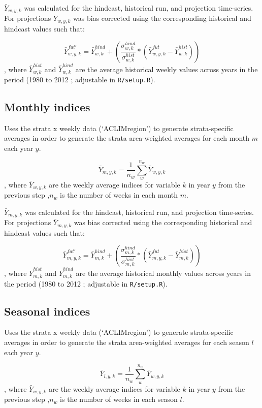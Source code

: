 \documentclass[
]{article}
\begin{document}
\(\bar{Y}_{w,y,k}\) was calculated for the hindcast, historical run, and
projection time-series. For projections \(\bar{Y}_{w,y,k}\) was bias
corrected using the corresponding historical and hindcast values such
that:

\[\bar{Y}^{fut'}_{w,y,k} =\bar{Y}^{hind}_{w,k} +\left( \frac{\sigma^{hind}_{w,k}}{\sigma^{hist}_{w,k}}*(\bar{Y}^{fut}_{w,y,k}-\bar{Y}^{hist}_{w,k})  \right )\],
where \(\bar{Y}^{hist}_{w,k}\) and \(\bar{Y}^{hind}_{w,k}\) are the
average historical weekly values across years in the period (1980 to
2012 ; adjustable in \texttt{R/setup.R}).

\hypertarget{monthly-indices}{%
\subsection{Monthly indices}\label{monthly-indices}}

Uses the strata x weekly data (`ACLIMregion') to generate
strata-specific averages in order to generate the strata area-weighted
averages for each month \(m\) each year \(y\).

\[\bar{Y}_{m,y,k}= \frac{1}{n_w}\sum^{n_w}_{w}\bar{Y}_{w,y,k}\], where
\(\bar{Y}_{w,y,k}\) are the weekly average indices for variable \(k\) in
year \(y\) from the previous step ,\(n_w\) is the number of weeks in
each month \(m\).

\(\bar{Y}_{m,y,k}\) was calculated for the hindcast, historical run, and
projection time-series. For projections \(\bar{Y}_{m,y,k}\) was bias
corrected using the corresponding historical and hindcast values such
that:

\[\bar{Y}^{fut'}_{m,y,k} =\bar{Y}^{hind}_{m,k} +\left( \frac{\sigma^{hind}_{m,k}}{\sigma^{hist}_{m,k}}*(\bar{Y}^{fut}_{m,y,k}-\bar{Y}^{hist}_{m,k})  \right )\],
where \(\bar{Y}^{hist}_{m,k}\) and \(\bar{Y}^{hind}_{m,k}\) are the
average historical monthly values across years in the period (1980 to
2012 ; adjustable in \texttt{R/setup.R}).

\hypertarget{seasonal-indices}{%
\subsection{Seasonal indices}\label{seasonal-indices}}

Uses the strata x weekly data (`ACLIMregion') to generate
strata-specific averages in order to generate the strata area-weighted
averages for each season \(l\) each year \(y\).

\[\bar{Y}_{l,y,k}= \frac{1}{n_w}\sum^{n_w}_{w}\bar{Y}_{w,y,k}\], where
\(\bar{Y}_{w,y,k}\) are the weekly average indices for variable \(k\) in
year \(y\) from the previous step ,\(n_w\) is the number of weeks in
each season \(l\).
\end{document}
